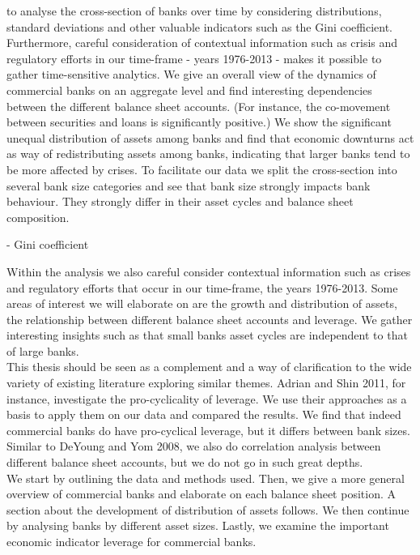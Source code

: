 \documentclass[12pt, a4paper]{article} %
\begin{document}
to analyse the cross-section of banks over time by considering distributions, standard deviations and other valuable indicators such as the Gini coefficient. Furthermore, careful consideration of contextual information such as crisis and regulatory efforts in our time-frame - years 1976-2013 - makes it possible to gather time-sensitive analytics.
We give an overall view of the dynamics of commercial banks on an aggregate level and find interesting dependencies between the different balance sheet accounts. (For instance, the co-movement between securities and loans is significantly positive.)
We show the significant unequal distribution of assets among banks and find that economic downturns act as way of redistributing assets among banks, indicating that larger banks tend to be more affected by crises.
To facilitate our data we split the cross-section into several bank size categories and see that bank size strongly impacts bank behaviour. They strongly differ in their asset cycles and balance sheet composition.  


- Gini coefficient 


Within the analysis we also careful consider contextual information such as crises and regulatory efforts that occur in our time-frame, the years 1976-2013. Some areas of interest we will elaborate on are the growth and distribution of assets, the relationship between different balance sheet accounts and leverage. We gather interesting insights such as that small banks asset cycles are independent to that of large banks.\\
This thesis should be seen as a complement and a way of clarification to the wide variety of existing literature exploring similar themes. Adrian and Shin 2011, for instance, investigate the pro-cyclicality of leverage. We use their approaches as a basis to apply them on our data and compared the results. We find that indeed commercial banks do have pro-cyclical leverage, but it differs between bank sizes. Similar to DeYoung and Yom 2008, we also do correlation analysis between different balance sheet accounts, but we do not go in such great depths.\\
We start by outlining the data and methods used. Then, we give a more general overview of commercial banks and elaborate on each balance sheet position. A section about the development of distribution of assets follows. We then continue by analysing banks by different asset sizes. Lastly, we examine the important economic indicator leverage for commercial banks.
\end{document}
